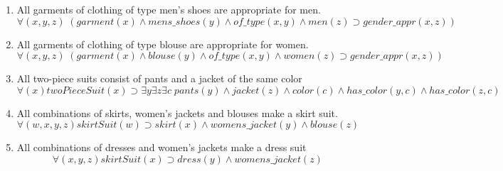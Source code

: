 \documentclass[paper=a4, fontsize=11pt]{scrartcl} %
\numberwithin{equation}{section} %
\numberwithin{figure}{section} %
\numberwithin{table}{section} %
\begin{document}
\begin{enumerate}
\item All garments of clothing of type men's shoes are appropriate for men.
\begin{equation*}
	\forall(x,y,z) \; (garment(x) \land mens\_shoes(y) \land of\_type(x,y) \land men(z) \supset gender\_appr(x,z)) 
\end{equation*}

\item All garments of clothing of type blouse are appropriate for women.
\begin{equation*}
	\forall(x,y,z) \; (garment(x) \land blouse(y) \land of\_type(x,y) \land women(z) \supset gender\_appr(x,z)) 
\end{equation*}

\item All two-piece suits consist of pants and a jacket of the same color
\begin{equation*}
	\forall(x) twoPieceSuit(x) \supset \exists y \exists z \exists c \; pants(y) \land jacket(z) \land color(c) \land has\_color(y,c) \land has\_color(z,c)
\end{equation*}


\item All combinations of skirts, women's jackets and blouses make a skirt suit.
\begin{equation*}
	\forall(w,x,y,z) skirtSuit(w) \supset skirt(x) \land womens\_jacket(y) \land blouse(z) 
\end{equation*}

\item All combinations of dresses and women's jackets make a dress suit
\begin{equation*}
	\forall(x,y,z) skirtSuit(x) \supset dress(y) \land womens\_jacket(z) 
\end{equation*}

\end{enumerate}
\end{document}
